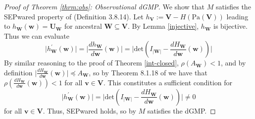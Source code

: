\documentclass[12pt]{article}
\begin{document}






\begin{proof}[Proof of Theorem \ref{thrm:obs}: Observational dGMP]
We show that $M$ satisfies the SEPwared property of \cite{MarkovCyclesLatent} (Definition 3.8.14).
Let $h_\mathbf{V}:=\mathbf{V}-H(\text{Pa}(\mathbf{V}))$ leading to $h_\mathbf{W}(\mathbf{w})=\mathbf{U}_\mathbf{W}$ for ancestral $\mathbf{W} \subseteq \mathbf{V}$.
By Lemma \ref{injective}, $h_\mathbf{W}$ is bijective. 
Thus we can evaluate 
\[
\lvert h^\prime_{\mathbf{W}}(\mathbf{w})\rvert = \lvert \frac{dh_\mathbf{W}}{d\mathbf{w}}(\mathbf{w})\rvert=\lvert\text{det}(I_{|\mathbf{W}|}-\frac{dH_\mathbf{W}}{d\mathbf{w}}(\mathbf{w}))\rvert
\]
By similar reasoning to the proof of Theorem \ref{int-closed}, $\rho(A_{\mathbf{W}})<1$, and by definition $\lvert \frac{dH_\mathbf{W}}{d\mathbf{w}}(\mathbf{w}) \rvert \preceq A_{\mathbf{W}}$, so by Theorem 8.1.18 of \cite{MatrixAnalysis} we have that $\rho(\frac{dH_\mathbf{W}}{d\mathbf{w}}(\mathbf{w}))<1$ for all $\mathbf{v}\in\mathbf{V}$.
This constitutes a sufficient condition for 
\[
\lvert h^\prime_{\mathbf{W}}(\mathbf{w})\rvert =\lvert\text{det}(I_{|\mathbf{W}|}-\frac{dH_\mathbf{W}}{d\mathbf{w}}(\mathbf{w}))\rvert \neq 0 
\]
for all $\mathbf{v}\in\mathbf{V}$.
Thus, SEPwared holds, so by \cite{MarkovCyclesLatent} $M$ satisfies the dGMP.
\end{proof}
\end{document}
